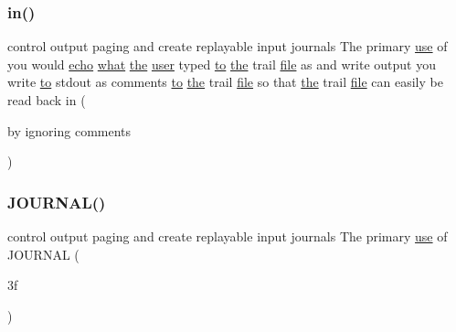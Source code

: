 \subsubsection{\texorpdfstring{in()}{in()}}
{\footnotesize\ttfamily control output paging and create replayable input journals The primary \hyperlink{intro__blas1_83_8txt_a04fa2694d85f67a675bb3f45f7241f48}{use} of you would \hyperlink{__echo_8f90_a7b58d66872f4cd7b2249cc9d9996f08a}{echo} \hyperlink{what__overview_81_8txt_a8cdf8efd1b900d6dce77a3f97edb2216}{what} \hyperlink{M__stopwatch_83_8txt_a0f266597de2e57eb3aa964927bb30e14}{the} \hyperlink{M__stopwatch_83_8txt_ae5f4c36a1ae7eba7900823c418223f72}{user} typed \hyperlink{M__stopwatch_83_8txt_a97209fd3e34ef701c0a9734280779cbb}{to} \hyperlink{M__stopwatch_83_8txt_a0f266597de2e57eb3aa964927bb30e14}{the} trail \hyperlink{what__overview_81_8txt_a447b56c526e8da30e0dc94673727ee25}{file} as and write output you write \hyperlink{M__stopwatch_83_8txt_a97209fd3e34ef701c0a9734280779cbb}{to} stdout as comments \hyperlink{M__stopwatch_83_8txt_a97209fd3e34ef701c0a9734280779cbb}{to} \hyperlink{M__stopwatch_83_8txt_a0f266597de2e57eb3aa964927bb30e14}{the} trail \hyperlink{what__overview_81_8txt_a447b56c526e8da30e0dc94673727ee25}{file} so that \hyperlink{M__stopwatch_83_8txt_a0f266597de2e57eb3aa964927bb30e14}{the} trail \hyperlink{what__overview_81_8txt_a447b56c526e8da30e0dc94673727ee25}{file} can easily be read back in (\begin{DoxyParamCaption}\item[{by ignoring}]{comments }\end{DoxyParamCaption})}

\mbox{\label{M__journal_83_8txt_aee6db01e1c6132b5b3f146b5a0c6e7e1}} 
\subsubsection{\texorpdfstring{J\+O\+U\+R\+N\+A\+L()}{JOURNAL()}}
{\footnotesize\ttfamily control output paging and create replayable input journals The primary \hyperlink{intro__blas1_83_8txt_a04fa2694d85f67a675bb3f45f7241f48}{use} of J\+O\+U\+R\+N\+AL (\begin{DoxyParamCaption}\item[{3f}]{ }\end{DoxyParamCaption})}

